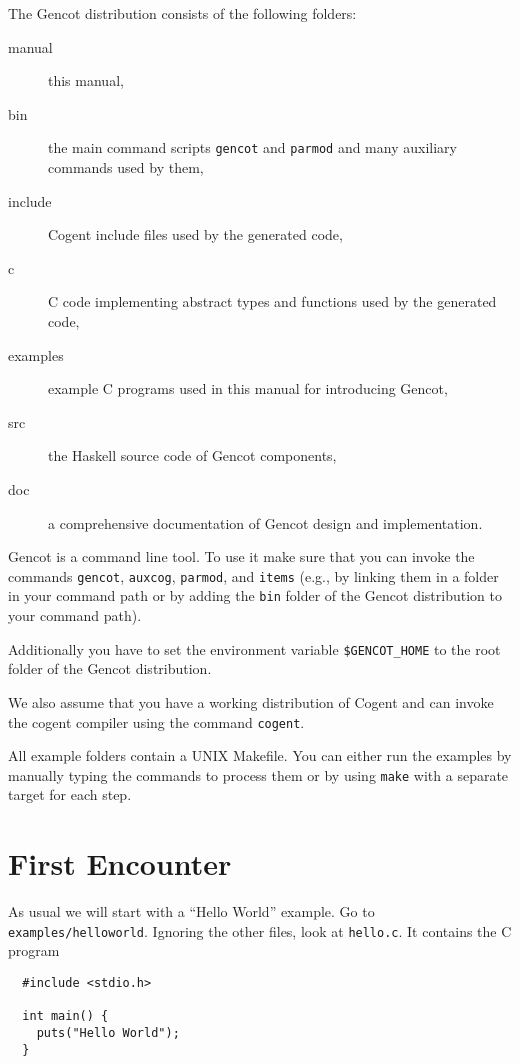 \documentclass[a4paper]{report}
\newcommand{\code}[1]{\textnormal{\texttt{#1}}}
\begin{document}
The Gencot distribution consists of the following folders:
\begin{description}
\item[manual] this manual,
\item[bin] the main command scripts \code{gencot} and \code{parmod} and many auxiliary commands used by them,
\item[include] Cogent include files used by the generated code,
\item[c] C code implementing abstract types and functions used by the generated code,
\item[examples] example C programs used in this manual for introducing Gencot,
\item[src] the Haskell source code of Gencot components,
\item[doc] a comprehensive documentation of Gencot design and implementation.
\end{description}

Gencot is a command line tool. To use it make sure that you can invoke the commands \code{gencot}, \code{auxcog},
\code{parmod}, and \code{items} (e.g., by linking them in a folder in your command path or by adding the \code{bin} folder
of the Gencot distribution to your command path).

Additionally you have to set the environment variable \code{\$GENCOT\_HOME} to the root folder of the Gencot
distribution.

We also assume that you have a working distribution of Cogent and can invoke the cogent compiler using the
command \code{cogent}.

All example folders contain a UNIX Makefile. You can either run the examples by manually typing the commands
to process them or by using \code{make} with a separate target for each step.

\section{First Encounter}
\label{intro-first}

As usual we will start with a ``Hello World'' example. Go to \code{examples/helloworld}. Ignoring the other files,
look at \code{hello.c}. It contains the C program
\begin{verbatim}
  #include <stdio.h>

  int main() {
    puts("Hello World");
  }
\end{verbatim}
\end{document}
